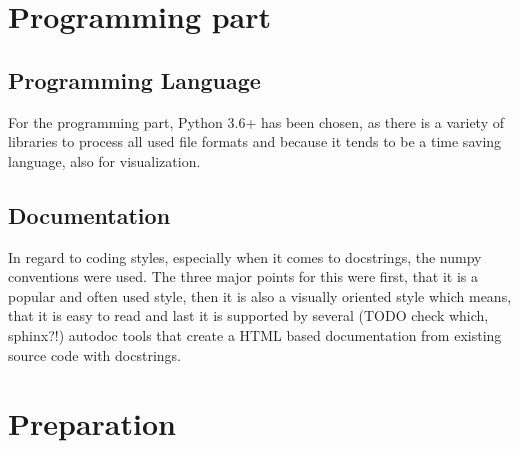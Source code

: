 \section{Programming part}
\label{sec:prog}

\subsection{Programming Language}

For the programming part, Python 3.6+ has been chosen, as there is a variety of libraries to process all used file formats and because it tends to be a time saving language, also for visualization.\\

\subsection{Documentation}

In regard to coding styles, especially when it comes to docstrings, the numpy conventions were used. The three major points for this were first, that it is a popular and often used style, then it is also a visually oriented style which means, that it is easy to read and last it is supported by several (TODO check which, sphinx?!) autodoc tools that create a HTML based documentation from existing source code with docstrings.\\


\section{Preparation}


